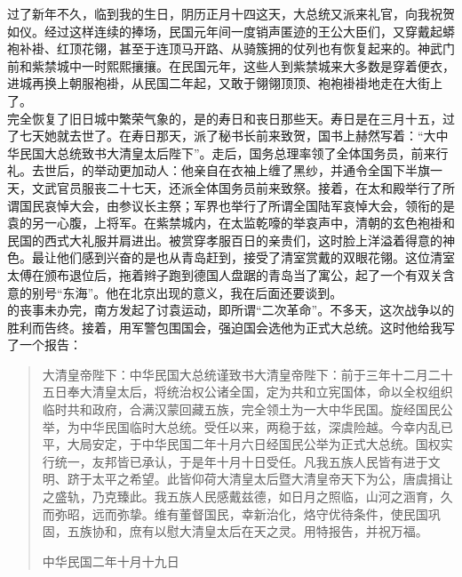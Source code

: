 过了新年不久，临到我的生日，阴历正月十四这天，大总统又派来礼官，向我祝贺如仪。经过这样连续的捧场，民国元年间一度销声匿迹的王公大臣们，又穿戴起蟒袍补褂、红顶花翎，甚至于连顶马开路、从骑簇拥的仗列也有恢复起来的。神武门前和紫禁城中一时熙熙攘攘。在民国元年，这些人到紫禁城来大多数是穿着便衣，进城再换上朝服袍褂，从民国二年起，又敢于翎翎顶顶、袍袍褂褂地走在大街上了。\\

完全恢复了旧日城中繁荣气象的，是的寿日和丧日那些天。寿日是在三月十五，过了七天她就去世了。在寿日那天，派了秘书长前来致贺，国书上赫然写着：“大中华民国大总统致书大清皇太后陛下”。走后，国务总理率领了全体国务员，前来行礼。去世后，的举动更加动人：他亲自在衣袖上缠了黑纱，并通令全国下半旗一天，文武官员服丧二十七天，还派全体国务员前来致祭。接着，在太和殿举行了所谓国民哀悼大会，由参议长主祭；军界也举行了所谓全国陆军哀悼大会，领衔的是袁的另一心腹，上将军。在紫禁城内，在太监乾嚎的举哀声中，清朝的玄色袍褂和民国的西式大礼服并肩进出。被赏穿孝服百日的亲贵们，这时脸上洋溢着得意的神色。最让他们感到兴奋的是也从青岛赶到，接受了清室赏戴的双眼花翎。这位清室太傅在颁布退位后，拖着辫子跑到德国人盘踞的青岛当了寓公，起了一个有双关含意的别号“东海”。他在北京出现的意义，我在后面还要谈到。\\

的丧事未办完，南方发起了讨袁运动，即所谓“二次革命”。不多天，这次战争以的胜利而告终。接着，用军警包围国会，强迫国会选他为正式大总统。这时他给我写了一个报告：\\

\begin{quote}
	大清皇帝陛下：中华民国大总统谨致书大清皇帝陛下：前于三年十二月二十五日奉大清皇太后，将统治权公诸全国，定为共和立宪国体，命以全权组织临时共和政府，合满汉蒙回藏五族，完全领土为一大中华民国。旋经国民公举，为中华民国临时大总统。受任以来，两稳于兹，深虞险越。今幸内乱已平，大局安定，于中华民国二年十月六日经国民公举为正式大总统。国权实行统一，友邦皆已承认，于是年十月十日受任。凡我五族人民皆有进于文明、跻于太平之希望。此皆仰荷大清皇太后暨大清皇帝天下为公，唐虞揖让之盛轨，乃克臻此。我五族人民感戴兹德，如日月之照临，山河之涵育，久而弥昭，远而弥挚。维有董督国民，幸新治化，烙守优待条件，使民国巩固，五族协和，庶有以慰大清皇太后在天之灵。用特报告，并祝万福。\\

\begin{flushright}
	中华民国二年十月十九日\\

\end{flushright}


\end{quote}

